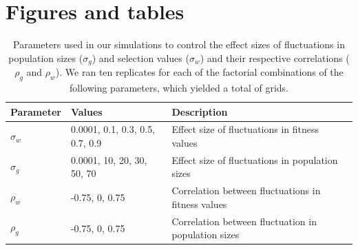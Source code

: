 \documentclass[12pt]{article}
\begin{document}
\section*{Figures and tables }


\begin{table}[h]
\fontsize{10}{18}\selectfont
\centering
\caption{Parameters used in our simulations to control the effect sizes of fluctuations in population sizes ($\sigma_{g}$) and selection values ($\sigma_{w}$) and their respective correlations ($\rho_{g}$ and $\rho_{w}$). We ran ten replicates for each of the factorial combinations of the following parameters, which yielded a total of grids. }
\begin{tabular}{@{}llll@{}}
\toprule
Parameter                    & Values                    & Description                                   &  \\ \midrule
$\sigma_{w}$ & 0.0001, 0.1, 0.3, 0.5, 0.7, 0.9 & Effect size of fluctuations in fitness values &  \\
$\sigma_{g}$ & 0.0001, 10, 20, 30, 50, 70 & Effect size of fluctuations in population sizes                                              &  \\
$\rho_{w}$  &  -0.75, 0, 0.75                         &   Correlation between fluctuations in fitness values                                            &  \\
$\rho_{g}$  &   -0.75, 0, 0.75                        &  Correlation between fluctuation in population sizes                                             &  \\ \bottomrule
\end{tabular}
\label{tab:fluctuations}
\end{table}
\end{document}
